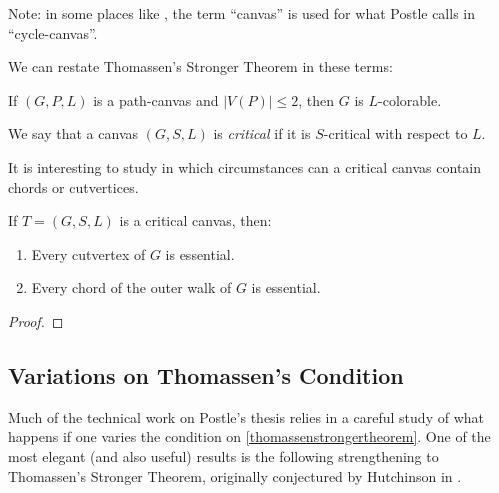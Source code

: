 Note: in some places like \cite{fivelistcoloring2}, the term ``canvas'' is used for what Postle calls in \cite{postlethesis} ``cycle-canvas''.

We can restate Thomassen's Stronger Theorem in these terms:

\begin{theorem}
If $(G, P, L)$ is a path-canvas and $|V(P)| \leq 2$, then $G$ is $L$-colorable.
\end{theorem}

\begin{definition}
We say that a canvas $(G, S, L)$ is \emph{critical} if it is $S$-critical with respect to $L$.
\end{definition}

It is interesting to study in which circumstances can a critical canvas contain chords or cutvertices.


\begin{definition}

\end{definition}

\begin{lemma}
	If $T = (G, S, L)$ is a critical canvas, then:

	\begin{enumerate}
		\item Every cutvertex of $G$ is essential.
		\item Every chord of the outer walk of $G$ is essential.
	\end{enumerate}
\end{lemma}

\begin{proof}

\end{proof}



\subsection{Variations on Thomassen's Condition}

Much of the technical work on Postle's thesis relies in a careful study of what happens if one varies the condition on \ref{thomassenstrongertheorem}. One of the most elegant (and also useful) results is the following strengthening to Thomassen's Stronger Theorem, originally conjectured by Hutchinson in \cite{hutchinson2012outerplanar}.

